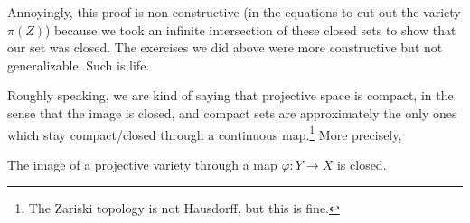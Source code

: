 \begin{remark}
	Annoyingly, this proof is non-constructive (in the equations to cut out the variety $\pi(Z)$) because we took an infinite intersection of these closed sets to show that our set was closed. The exercises we did above were more constructive but not generalizable. Such is life.
\end{remark}

Roughly speaking, we are kind of saying that projective space is compact, in the sense that the image is closed, and compact sets are approximately the only ones which stay compact/closed through a continuous map.\footnote{The Zariski topology is not Hausdorff, but this is fine.} More precisely, 
\begin{corollary}
	The image of a projective variety through a map $\varphi\colon Y\to X$ is closed.
\end{corollary}
